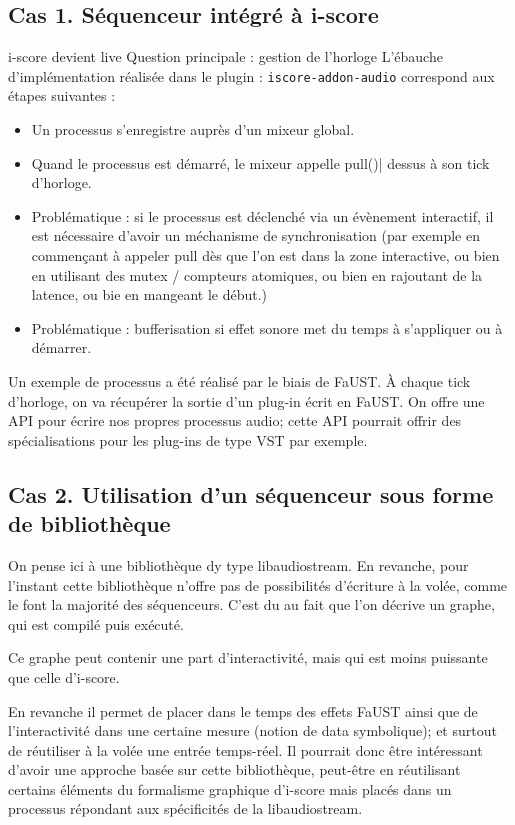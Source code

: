 \documentclass[french,12pt,a4paper]{article}
\begin{document}
\subsection{Cas 1. Séquenceur intégré à i-score}
i-score devient live
Question principale : gestion de l'horloge
L'ébauche d'implémentation réalisée dans le plugin : \lstinline|iscore-addon-audio|
correspond aux étapes suivantes : 
\begin{itemize}
\item Un processus s'enregistre auprès d'un mixeur global.
\item Quand le processus est démarré, le mixeur appelle \lstinline||pull()| dessus à son tick d'horloge.
\item Problématique : si le processus est déclenché via un évènement interactif, il est nécessaire d'avoir un méchanisme de synchronisation (par exemple en commençant à appeler pull dès que l'on est dans la zone interactive, ou bien en utilisant des mutex / compteurs atomiques, ou bien en rajoutant de la latence, ou bie en mangeant le début.)
\item Problématique : bufferisation si effet sonore met du temps à s'appliquer ou à démarrer.
\end{itemize}

Un exemple de processus a été réalisé par le biais de FaUST.
À chaque tick d'horloge, on va récupérer la sortie d'un plug-in écrit en FaUST.
On offre une API pour écrire nos propres processus audio; cette API pourrait offrir des spécialisations pour les plug-ins de type VST par exemple.

\subsection{Cas 2. Utilisation d'un séquenceur sous forme de bibliothèque}
On pense ici à une bibliothèque dy type libaudiostream.
En revanche, pour l'instant cette bibliothèque n'offre pas de possibilités 
d'écriture à la volée, comme le font la majorité des séquenceurs.
C'est du au fait que l'on décrive un graphe, qui est compilé puis exécuté.

Ce graphe peut contenir une part d'interactivité, mais 
qui est moins puissante que celle d'i-score.

En revanche il permet de placer dans le temps des effets FaUST ainsi 
que de l'interactivité dans une certaine mesure (notion de data symbolique); et surtout de réutiliser à
la volée une entrée temps-réel.
Il pourrait donc être intéressant d'avoir une approche basée sur cette bibliothèque,
peut-être en réutilisant certains éléments du formalisme graphique d'i-score 
mais placés dans un processus répondant aux spécificités de la libaudiostream.
\end{document}
